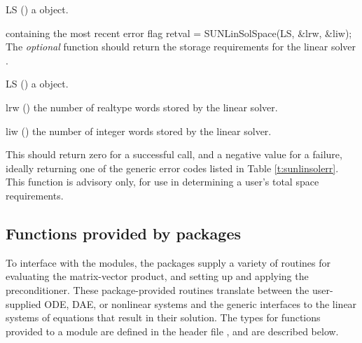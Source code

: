 {
  \begin{args}[LS]
  \item[LS] ()
    a {\sunlinsol} object.
  \end{args}
}
{
   containing the most recent error flag
}
{}
{
  retval = SUNLinSolSpace(LS, \&lrw, \&liw);
}
{
  The \emph{optional} function 
  should return the storage requirements for the linear
  solver .
}
{
  \begin{args}[lrw]
  \item[LS] ()
    a {\sunlinsol} object.
  \item[lrw] ()
    the number of realtype words stored by the linear solver.
  \item[liw] ()
    the number of integer words stored by the linear solver.
  \end{args}
}
{
  This should return zero for a successful call, and a negative value
  for a failure, ideally returning one of the generic error codes
  listed in Table \ref{t:sunlinsolerr}.
}
{
  This function is advisory only, for use in determining a user's
  total space requirements.
}



\subsection{Functions provided by {\sundials} packages}\label{ss:sunlinsol_SUNSuppliedFn}

To interface with the {\sunlinsol} modules, the {\sundials} packages
supply a variety of routines for evaluating the matrix-vector product,
and setting up and applying the preconditioner.  These
package-provided routines translate between the user-supplied ODE, DAE,
or nonlinear systems and the generic interfaces to the linear systems
of equations that result in their solution.  The types for functions
provided to a {\sunlinsol} module are defined in the header
file , and are described below.



